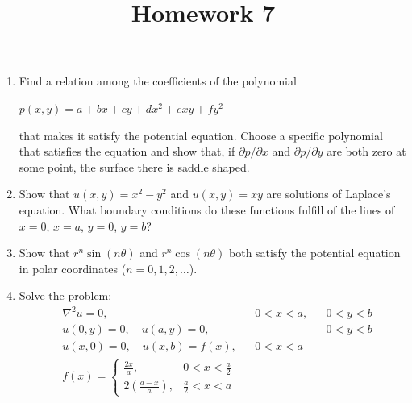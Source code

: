 \documentclass[12pt]{article}
\title{Homework 7}
\begin{document}
\maketitle

\begin{enumerate}
    \item Find a relation among the coefficients of the polynomial
          \begin{center}
              $
                  p(x,y)=a+bx+cy+dx^{2}+exy+fy^{2}
              $
          \end{center}
          that makes it satisfy the potential equation.
          Choose a specific polynomial that satisfies the equation and show that,
          if $\partial p / \partial x$ and $\partial p / \partial y$ are both zero at some point,
          the surface there is saddle shaped.
          
    \item Show that $u(x,y)=x^{2}-y^{2}$ and $u(x,y)=xy$ are solutions of Laplace's equation.
          What boundary conditions do these functions fulfill of the lines of $x=0$, $x=a$, $y=0$, $y=b$?
          
    \item Show that $r^{n}\sin(n\theta)$ and $r^{n}\cos(n\theta)$ both satisfy the potential equation in polar coordinates ($n = 0, 1, 2, \dots$).
          
    \item Solve the problem:
          \begin{align*}
               & \nabla^{2}u = 0,                                          &  & 0<x<a, &  & 0<y<b \\
               & u(0, y) = 0, \quad u(a,y) = 0,                            &  &        &  & 0<y<b \\
               & u(x, 0) = 0, \quad u(x,b) = f(x),                         &  & 0<x<a             \\
               & f(x) = \begin{cases}
                            \frac{2x}{a},                    & 0<x<\frac{a}{2}     \\
                            2\left( \frac{a - x}{a} \right), & \frac{a}{2} < x < a
                        \end{cases}
          \end{align*}
          
\end{enumerate}
\end{document}
